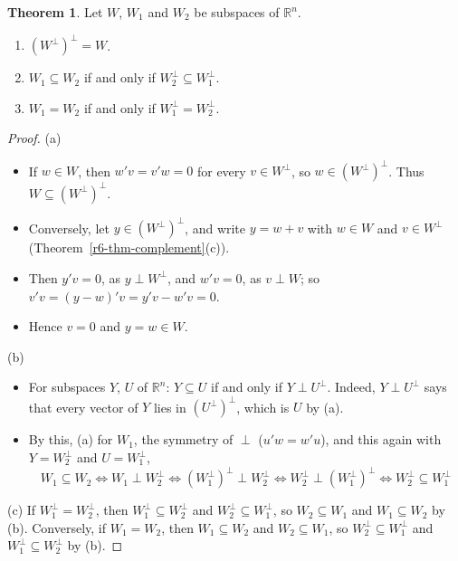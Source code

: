 \documentclass[12pt]{article}
\newcommand{\R}{\mathbb R}
\theoremstyle{definition}
\newtheorem{theorem}{Theorem}
\begin{document}
\begin{theorem}\label{r6-thm-perp-perp}
Let \(W\), \(W_1\) and \(W_2\) be subspaces of \(\R^n\).
\begin{enumerate}
\item \((W^\perp)^\perp=W\).
\item \(W_1\subseteq W_2\) if and only if \(W_2^\perp\subseteq W_1^\perp\).
\item \(W_1=W_2\) if and only if \(W_1^\perp=W_2^\perp\).
\end{enumerate}
\end{theorem}
\begin{proof}
(a)
\begin{itemize}
\item If \(w\in W\), then \(w'v=v'w=0\) for every \(v\in W^\perp\), so \(w\in(W^\perp)^\perp\). Thus
\(W\subseteq(W^\perp)^\perp\).
\item Conversely, let \(y\in(W^\perp)^\perp\), and write \(y=w+v\) with \(w\in W\) and \(v\in W^\perp\)
(Theorem~\ref{r6-thm-complement}(c)).
\item Then \(y'v=0\), as \(y\perp W^\perp\), and \(w'v=0\), as \(v\perp W\); so
\(v'v=(y-w)'v=y'v-w'v=0\).
\item Hence \(v=0\) and \(y=w\in W\).
\end{itemize}
(b)
\begin{itemize}
\item For subspaces \(Y\), \(U\) of \(\R^n\): \(Y\subseteq U\) if and only if \(Y\perp U^\perp\). Indeed,
\(Y\perp U^\perp\) says that every vector of \(Y\) lies in \((U^\perp)^\perp\), which is \(U\) by (a).
\item By this, (a) for \(W_1\), the symmetry of \(\perp\) (\(u'w=w'u\)), and this again with
\(Y=W_2^\perp\) and \(U=W_1^\perp\),
\[
W_1\subseteq W_2\iff W_1\perp W_2^\perp\iff(W_1^\perp)^\perp\perp W_2^\perp\iff W_2^\perp\perp(W_1^\perp)^\perp
\iff W_2^\perp\subseteq W_1^\perp
\]
\end{itemize}
(c) If \(W_1^\perp=W_2^\perp\), then \(W_1^\perp\subseteq W_2^\perp\) and \(W_2^\perp\subseteq W_1^\perp\), so
\(W_2\subseteq W_1\) and \(W_1\subseteq W_2\) by (b). Conversely, if \(W_1=W_2\), then \(W_1\subseteq W_2\) and
\(W_2\subseteq W_1\), so \(W_2^\perp\subseteq W_1^\perp\) and \(W_1^\perp\subseteq W_2^\perp\) by (b).
\end{proof}
\end{document}
